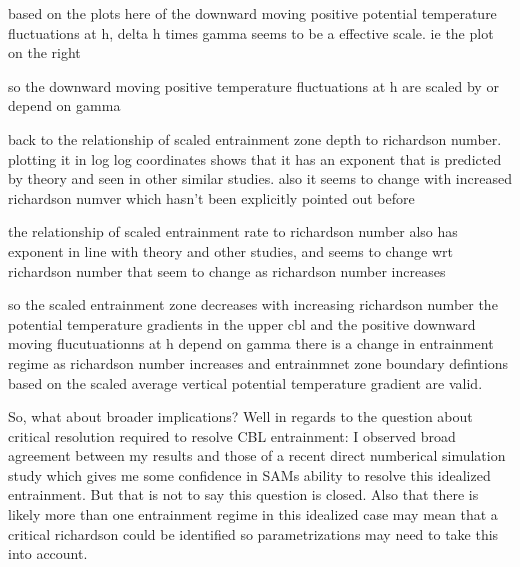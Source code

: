 \documentclass{beamer}
\begin{document}
\begin{frame}
based on the plots here of the downward moving positive potential temperature fluctuations at h, delta h times gamma seems to be a effective scale. ie the plot on the right
\end{frame}


\begin{frame}
so the downward moving positive temperature fluctuations at h are scaled by or depend on gamma
\end{frame}

\begin{frame}
back to the relationship of scaled entrainment zone depth to richardson number.  plotting it in log log coordinates shows that it has an exponent that is predicted by theory and seen in other similar studies.  also it seems to change with increased richardson numver which hasn't been explicitly pointed out before\\
\end{frame}

\begin{frame}
the relationship of scaled entrainment rate to richardson number also has exponent in line with theory and other studies, and seems to change wrt richardson number that seem to change as richardson number increases
\end{frame}

\begin{frame}
so the scaled entrainment zone decreases with increasing richardson number the potential temperature gradients in the upper cbl and the positive downward moving flucutuationns at h depend on gamma there is a change in entrainment regime as richardson number increases and entrainmnet zone boundary defintions based on the scaled average vertical potential temperature gradient are valid.
\end{frame}

\begin{frame}
So, what about broader implications? Well in regards to the question about critical resolution required to resolve CBL entrainment: I observed broad agreement between my results and those of a recent direct numberical simulation study which gives me some confidence in SAMs ability to resolve this idealized entrainment.  But that is not to say this question is closed.  Also that there is likely more than one entrainment regime in this idealized case may mean that a critical richardson could be identified so parametrizations may need to take this into account.
\end{frame}
\end{document}
